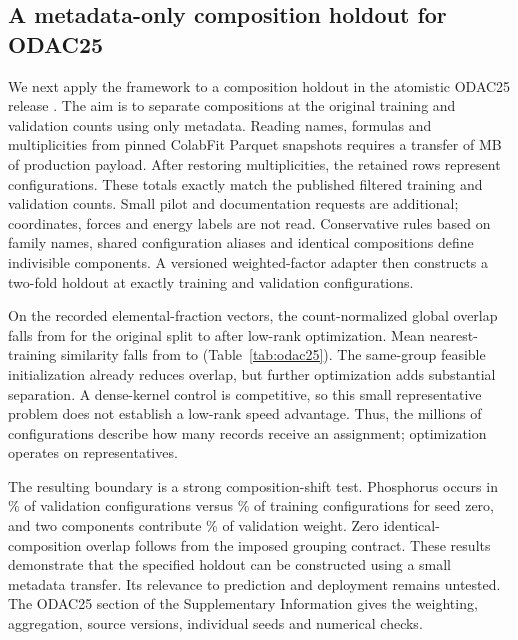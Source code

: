 \subsection{A metadata-only composition holdout for ODAC25}
\label{sec:odac25}

We next apply the framework to a composition holdout in the atomistic ODAC25
release \citep{sriram2026odac25}. The aim is to separate compositions at the
original training and validation counts using only metadata. Reading names,
formulas and multiplicities from pinned ColabFit Parquet snapshots requires a
transfer of \ODACTransferMB{} MB of production payload. After restoring
multiplicities, the \ODACUniqueRows{} retained rows represent \ODACFrames{}
configurations. These totals exactly match the published filtered training and
validation counts. Small pilot and documentation requests are additional;
coordinates, forces and energy labels are not read. Conservative rules based on
family names, shared configuration aliases and identical compositions define
\ODACGroups{} indivisible components. A versioned weighted-factor adapter then
constructs a two-fold holdout at exactly \ODACTrain{} training and \ODACVal{}
validation configurations.

On the recorded elemental-fraction vectors, the count-normalized global overlap
falls from \ODACOriginalGlobal{} for the original split to \ODACLowGlobal{}
after low-rank optimization. Mean nearest-training similarity falls from
\ODACOriginalNN{} to \ODACLowNN{} (Table~\ref{tab:odac25}). The same-group
feasible initialization already reduces overlap, but further optimization adds
substantial separation. A dense-kernel control is competitive, so this small
representative problem does not establish a low-rank speed advantage. Thus, the
millions of configurations describe how many records receive an assignment;
optimization operates on \ODACGroups{} representatives.



The resulting boundary is a strong composition-shift test. Phosphorus occurs in
\ODACPhosphorusVal\% of validation configurations versus \ODACPhosphorusTrain\%
of training configurations for seed zero, and two components contribute
\ODACTopTwo\% of validation weight. Zero identical- composition overlap follows
from the imposed grouping contract. These results demonstrate that the
specified holdout can be constructed using a small metadata transfer. Its
relevance to prediction and deployment remains untested. The ODAC25 section of
the Supplementary Information gives the weighting, aggregation, source
versions, individual seeds and numerical checks.
